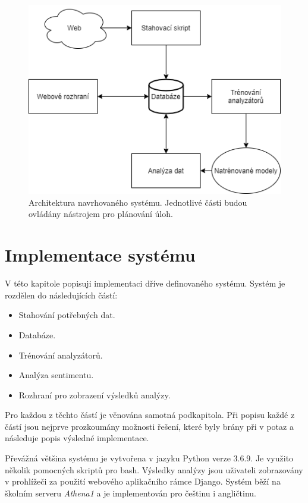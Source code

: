 \begin{figure}[!htb]
\label{schema}
\centering
\includegraphics[width=\textwidth/2]{system_diagram.png}
\caption{Architektura navrhovaného systému. Jednotlivé části budou ovládány nástrojem pro plánování úloh.}
\end{figure}


\chapter{Implementace systému}
\label{implementace}
V této kapitole popisuji implementaci dříve definovaného systému. 
Systém je rozdělen do následujících částí:  

\begin{itemize}
  \item Stahování potřebných dat.
  \item Databáze.
  \item Trénování analyzátorů.
  \item Analýza sentimentu.
  \item Rozhraní pro zobrazení výsledků analýzy.
\end{itemize}

Pro každou z těchto částí je věnována samotná podkapitola. Při popisu každé z částí jsou nejprve prozkoumány možnosti řešení, které byly brány při v potaz a následuje popis výsledné implementace. 

Převážná většina systému je vytvořena v jazyku Python verze 3.6.9. Je využito několik pomocných skriptů pro bash. Výsledky analýzy jsou uživateli zobrazovány v prohlížeči za použití webového aplikačního rámce Django.
Systém běží na školním serveru \emph{Athena1} a je implementován pro češtinu i angličtinu. 

